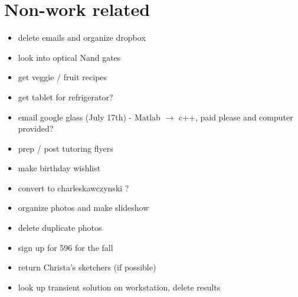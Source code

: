 \documentclass[11pt]{article}
\begin{document}
\section{Non-work related}
\begin{itemize}
\setlength\itemsep{-1em}
\item delete emails and organize dropbox
\item look into optical Nand gates
\item get veggie / fruit recipes
\item get tablet for refrigerator?
\item email google glass (July 17th) - Matlab $\rightarrow$ c++, paid please and computer provided?
\item prep / post tutoring flyers
\item make birthday wishlist
\item convert to charleskawczynski ?
\item organize photos and make slideshow
\item delete duplicate photos
\item sign up for 596 for the fall
\item return Christa's sketchers (if possible)
\item look up transient solution on workstation, delete results
\end{itemize}
\end{document}
